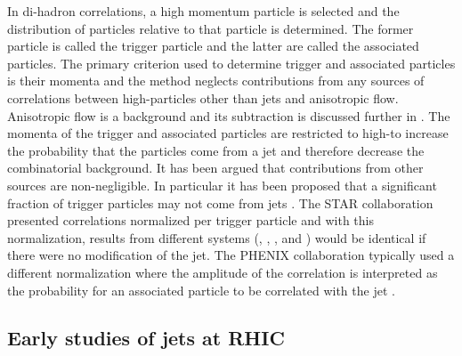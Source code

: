 
In di-hadron correlations, a high momentum particle is selected and the distribution of particles relative to that particle is determined.  The former particle is called the trigger particle and the latter are called the associated particles.  The primary criterion used to determine trigger and associated particles is their momenta and the method neglects contributions from any sources of correlations between high-\pT particles other than jets and anisotropic flow.  Anisotropic flow is a background and its subtraction is discussed further in .  The momenta of the trigger and associated particles are restricted to high-\pT to increase the probability that the particles come from a jet and therefore decrease the combinatorial background.  It has been argued that contributions from other sources are non-negligible.  In particular it has been proposed that a significant fraction of trigger particles may not come from jets \cite{Jia:2008kf}.  The STAR collaboration presented correlations normalized per trigger particle and with this normalization, results from different systems (\pp, \dAu, \Cu, and \Au) would be identical if there were no modification of the jet\cite{STARMiniJets2006,STARPunchThrough,STARLowPtAssoc2005,STARRxnPlane2004,STARIconicJetQuench2003,STARIconicJetQuench2002,STARJetQuench2002}.  The PHENIX collaboration typically used a different normalization where the amplitude of the correlation is interpreted as the probability for an associated particle to be correlated with the jet \cite{PHENIXPartIDCorr2007,PHENIXAuAu200Y4Corr2008,PHENIXDandruff,PHENIXCorrEnergyDependence,PHENIXppCorr,PHENIXAuAu200AwaySideCorr,PHENIXAuAu200Y2Corr}.


\subsection{Early studies of jets at RHIC}



